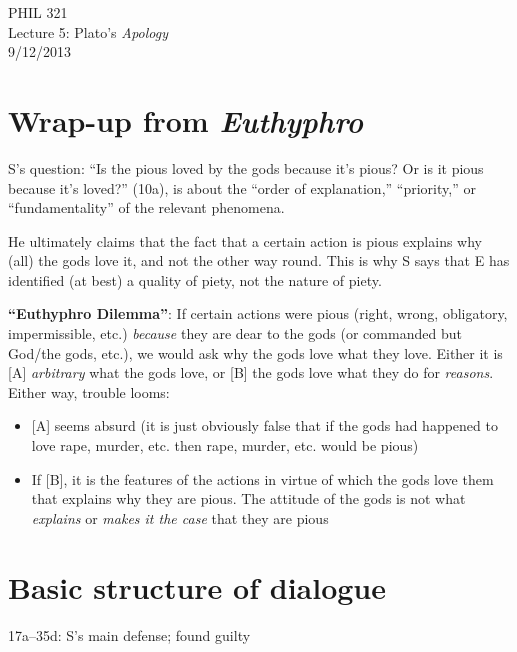 \documentclass[11pt]{article}
\begin{document}
\thispagestyle{empty}
\begin{center} \LARGE{PHIL 321\\ Lecture 5: Plato's \emph{Apology}}\\ \vspace*{2mm}
\large{9/12/2013}\end{center}
\thispagestyle{empty}\vspace*{3mm}
\vspace*{-8mm}
\section*{Wrap-up from \emph{Euthyphro}}

\noindent S's question: ``Is the pious loved by the gods because it's pious? Or is it pious because it's loved?'' (10a), is about the ``order of explanation,'' ``priority,'' or ``fundamentality'' of the relevant phenomena.
\vspace*{2mm}

\noindent He ultimately claims that the fact that a certain action is pious explains why (all) the gods love it, and not the other way round. This is why S says that E has identified (at best) a quality of piety, not the nature of piety.
\vspace*{2mm}

\noindent \textbf{``Euthyphro Dilemma''}: If certain actions were pious (right, wrong, obligatory, impermissible, etc.) \emph{because} they are dear to the gods (or commanded but God/the gods, etc.), we would ask why the gods love what they love. Either it is [A] \emph{arbitrary} what the gods love, or [B] the gods love what they do for \emph{reasons}. Either way, trouble looms:\begin{itemize}\item{[A] seems absurd (it is just obviously false that if the gods had happened to love rape, murder, etc. then rape, murder, etc. would be pious)}\item{If [B], it is the features of the actions in virtue of which the gods love them that explains why they are pious. The attitude of the gods is not what \emph{explains} or \emph{makes it the case} that they are pious} \end{itemize}

\vspace*{-3mm}
\section*{Basic structure of dialogue}
17a--35d: S's main defense; found guilty
\vspace*{2mm}
\end{document}
